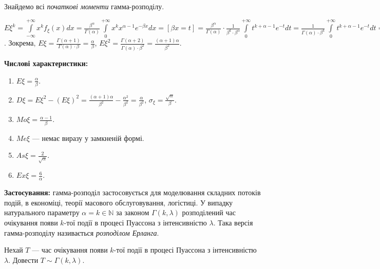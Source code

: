 Знайдемо всі \emph{початкові моменти} гамма-розподілу.

$E\xi^k = \int\limits_{-\infty}^{+\infty} x^k f_\xi(x)dx = \frac{\beta^\alpha}{\Gamma(\alpha)} \int\limits_0^{+\infty} x^k x^{\alpha-1} e^{-\beta x} dx = 
\left[ \beta x = t\right] = \frac{\beta^\alpha}{\Gamma(\alpha)} \cdot \frac{1}{\beta^k\cdot \beta^{\alpha}} \int\limits_0^{+\infty} t^{k+\alpha-1} e^{-t} dt = 
\frac{1}{\Gamma(\alpha) \cdot \beta^k} \int\limits_0^{+\infty} t^{k+\alpha-1} e^{-t} dt = \frac{\Gamma(\alpha+k)}{\Gamma(\alpha) \cdot \beta^k}$.
Зокрема, $E\xi = \frac{\Gamma(\alpha+1)}{\Gamma(\alpha) \cdot \beta} = \frac{\alpha}{\beta}$,
$E\xi^2 = \frac{\Gamma(\alpha+2)}{\Gamma(\alpha) \cdot \beta^2}  = \frac{(\alpha+1)\alpha}{\beta^2}$.

\noindent\textbf{Числові характеристики:}
\begin{enumerate}
    \item $E\xi = \frac{\alpha}{\beta}$.
    \item $D\xi = E\xi^2 - (E\xi)^2 = \frac{(\alpha+1)\alpha}{\beta^2} - \frac{\alpha^2}{\beta^2} = \frac{\alpha}{\beta^2}$, $\sigma_\xi = \frac{\sqrt{\alpha}}{\beta}$.
    \item ${Mo}\xi = \frac{\alpha-1}{\beta}$.
    \item ${Me}\xi$ --- немає виразу у замкненій формі.
    \item ${As}\xi = \frac{2}{\sqrt{\alpha}}$.
    \item ${Ex}\xi = \frac{6}{\alpha}$.
\end{enumerate}

\noindent\textbf{Застосування:} гамма-розподіл застосовується для моделювання
складних потоків подій, в економіці, теорії масового обслуговування, логістиці.
У випадку натурального параметру $\alpha = k \in \mathbb{N}$ за законом
$\Gamma(k, \lambda)$ розподілений час очікування появи $k$-тої події
в процесі Пуассона з інтенсивністю $\lambda$. Така версія гамма-розподілу називається \emph{розподілом Ерланга}.
\begin{exercise}
    Нехай $T$ --- час очікування появи $k$-тої події
    в процесі Пуассона з інтенсивністю $\lambda$. Довести $T \sim \Gamma(k, \lambda)$.
\end{exercise} %